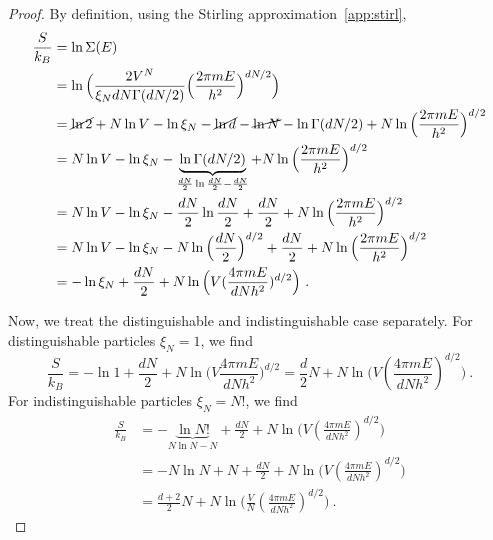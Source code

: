     \begin{proof}
        By definition, using the Stirling approximation~\eqref{app:stirl},
        \begin{equation*}
        \begin{aligned}
            \frac{S}{k_B} & = \ln \Sigma (E) \\ & = \ln \Big ( \frac{2V^{N}}{\xi_N d N \Gamma(dN/2)} \Big ( \frac{2 \pi m E}{h^2}\Big)^{dN/2} \Big ) \\ & = \cancel{\ln 2} + N \ln V - \ln \xi_N - \cancel{\ln d} - \cancel{\ln N} - \ln \Gamma (dN/2) + N \ln \Big (\frac{2 \pi m E}{h^2} \Big )^{d/2} \\ & =  N \ln V - \ln \xi_N - \underbrace{\ln \Gamma (dN/2)}_{\frac{dN}{2} \ln \frac{dN}{2} - \frac{dN}{2}} + N \ln \Big (\frac{2 \pi m E}{h^2} \Big )^{d/2} \\ & = N \ln V - \ln \xi_N - \frac{dN}{2} \ln \frac{dN}{2} + \frac{dN}{2} + N \ln \Big (\frac{2 \pi m E}{h^2} \Big )^{d/2} \\ & = N \ln V - \ln \xi_N - N \ln \Big(\frac{dN}{2} \Big)^{d/2} + \frac{dN}{2} + N \ln \Big (\frac{2 \pi m E}{h^2} \Big )^{d/2} \\ & = - \ln \xi_N + \frac{dN}{2} + N \ln \Big ( V (\frac{4 \pi m E}{d N h^2})^{d/2} \Big) ~.
        \end{aligned}
        \end{equation*}

        Now, we treat the distinguishable and indistinguishable case separately. For distinguishable particles $\xi_N = 1$, we find
        \begin{equation*}
            \frac{S}{k_B} = - \ln 1 + \frac{dN}{2} + N \ln \Big (V \frac{4 \pi m E}{dNh^2} \Big )^{d/2} = \frac{d}{2} N + N \ln \Big ( V (\frac{4 \pi m E}{d N h^2})^{d/2} \Big) ~.
        \end{equation*}
        For indistinguishable particles $\xi_N = N!$, we find
        \begin{equation*}
        \begin{aligned}
            \frac{S}{k_B} & = - \underbrace{\ln N!}_{N \ln N - N} + \frac{dN}{2} + N \ln \Big ( V (\frac{4 \pi m E}{d N h^2})^{d/2} \Big) \\ & = - N \ln N + N + \frac{dN}{2} + N \ln \Big ( V (\frac{4 \pi m E}{d N h^2})^{d/2} \Big) \\ & = \frac{d + 2}{2} N + N \ln \Big ( \frac{V}{N} (\frac{4 \pi m E}{d N h^2})^{d/2} \Big) ~.
        \end{aligned}
        \end{equation*}
    \end{proof}


